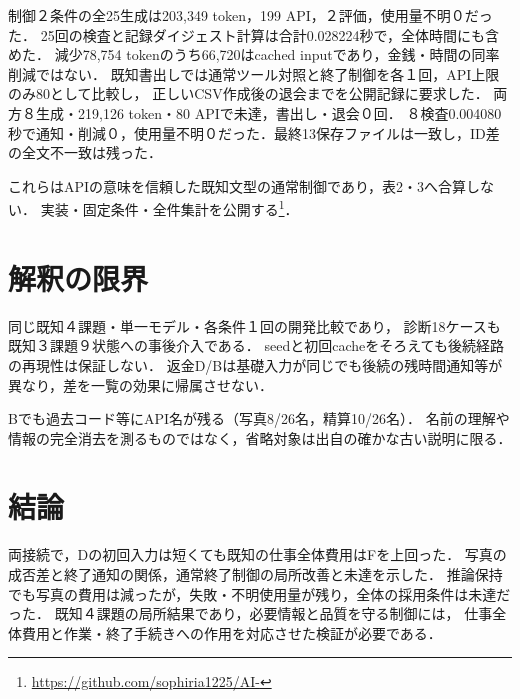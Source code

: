 \documentclass[letter]{ieicej}
\begin{document}
制御２条件の全25生成は203,349 token，199 API，２評価，使用量不明０だった．
25回の検査と記録ダイジェスト計算は合計0.028224秒で，全体時間にも含めた．
減少78,754 tokenのうち66,720はcached inputであり，金銭・時間の同率削減ではない．
既知書出しでは通常ツール対照と終了制御を各１回，API上限のみ80として比較し，
正しいCSV作成後の退会までを公開記録に要求した．
両方８生成・219,126 token・80 APIで未達，書出し・退会０回．
８検査0.004080秒で通知・削減０，使用量不明０だった．最終13保存ファイルは一致し，ID差の全文不一致は残った．

これらはAPIの意味を信頼した既知文型の通常制御であり，表2・3へ合算しない．
実装・固定条件・全件集計を公開する\footnote{\url{https://github.com/sophiria1225/AI-}}．



\section{解釈の限界}
同じ既知４課題・単一モデル・各条件１回の開発比較であり，
診断18ケースも既知３課題９状態への事後介入である．
seedと初回cacheをそろえても後続経路の再現性は保証しない．
返金D/Bは基礎入力が同じでも後続の残時間通知等が異なり，差を一覧の効果に帰属させない．

Bでも過去コード等にAPI名が残る（写真8/26名，精算10/26名）．
名前の理解や情報の完全消去を測るものではなく，省略対象は出自の確かな古い説明に限る．

\section{結論}
両接続で，Dの初回入力は短くても既知の仕事全体費用はFを上回った．
写真の成否差と終了通知の関係，通常終了制御の局所改善と未達を示した．
推論保持でも写真の費用は減ったが，失敗・不明使用量が残り，全体の採用条件は未達だった．
既知４課題の局所結果であり，必要情報と品質を守る制御には，
仕事全体費用と作業・終了手続きへの作用を対応させた検証が必要である．



\label{PreviewLastBodyPage}
\end{document}
